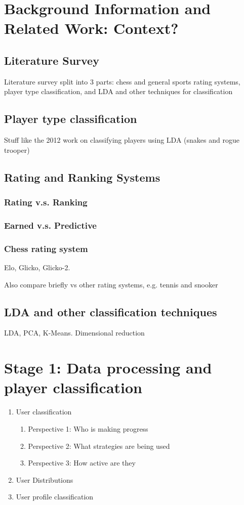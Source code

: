 \documentclass[a4paper]{article}
\begin{document}
\section{Background Information and Related Work: Context?}
\subsection{Literature Survey}
Literature survey split into 3 parts: chess and general sports rating systems, player type classification, and LDA and other techniques for classification

\subsection{Player type classification}
Stuff like the 2012 work on classifying players using LDA (snakes and rogue trooper)

\subsection{Rating and Ranking Systems}

\subsubsection{Rating v.s. Ranking}

\subsubsection{Earned v.s. Predictive}

\subsubsection{Chess rating system}
Elo, Glicko, Glicko-2.

Also compare briefly vs other rating systems, e.g. tennis and snooker

\subsection{LDA and other classification techniques}
LDA, PCA, K-Means. Dimensional reduction

\section{Stage 1: Data processing and player classification}
\begin{enumerate}
\item{User classification \\
	 \begin{enumerate}
		\item{Perspective 1: Who is making progress}
		\item{Perspective 2: What strategies are being used}
		\item{Perspective 3: How active are they}	
	\end{enumerate}}
\item{User Distributions}
\item{User profile classification}

\end{enumerate}
\end{document}
